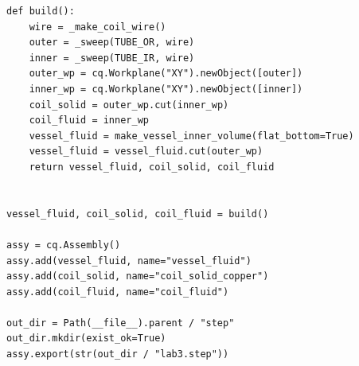 \begin{lstlisting}[style=python]
def build():
    wire = _make_coil_wire()
    outer = _sweep(TUBE_OR, wire)
    inner = _sweep(TUBE_IR, wire)
    outer_wp = cq.Workplane("XY").newObject([outer])
    inner_wp = cq.Workplane("XY").newObject([inner])
    coil_solid = outer_wp.cut(inner_wp)
    coil_fluid = inner_wp
    vessel_fluid = make_vessel_inner_volume(flat_bottom=True)
    vessel_fluid = vessel_fluid.cut(outer_wp)
    return vessel_fluid, coil_solid, coil_fluid


vessel_fluid, coil_solid, coil_fluid = build()

assy = cq.Assembly()
assy.add(vessel_fluid, name="vessel_fluid")
assy.add(coil_solid, name="coil_solid_copper")
assy.add(coil_fluid, name="coil_fluid")

out_dir = Path(__file__).parent / "step"
out_dir.mkdir(exist_ok=True)
assy.export(str(out_dir / "lab3.step"))
\end{lstlisting}


